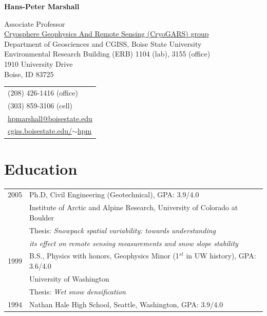 \documentclass[11pt]{article}
\def\name{Hans-Peter Marshall}
\begin{document}


\centerline{\Large \bf \name}

\vspace{0.25in}

\begin{minipage}{0.70\linewidth}
Associate Professor \\
  \href{http://earth.boisestate.edu/cryogars/}{Cryosphere Geophysics And Remote Sensing (CryoGARS) group} \\
  Department of Geosciences and CGISS, Boise State University \\
  Environmental Research Building (ERB) 1104 (lab), 3155 (office) \\
  1910 University Drive \\
  Boise, ID  83725
\end{minipage}
\begin{minipage}{0.30\linewidth}
  \begin{tabular}{l}
     (208) 426-1416 (office) \\
     (303) 859-3106 (cell) \\
    \href{mailto:hpmarshall@boisestate.edu}{hpmarshall@boisestate.edu} \\
    \href{http://cgiss.boisestate.edu/~hpm}{cgiss.boisestate.edu/$\sim$hpm} \\
  \end{tabular}
\end{minipage}

\section*{Education}

\begin{tabular}{ll}
	2005 & Ph.D, Civil Engineering (Geotechnical), GPA: 3.9/4.0 \\
	          & Institute of Arctic and Alpine Research, University of Colorado at Boulder \\
		 & Thesis: \textit{Snowpack spatial variability: towards understanding} \\
                  &   \textit{its effect on remote sensing measurements and snow slope stability} \\
	1999 &  B.S., Physics with honors, Geophysics Minor (1$^{st}$ in UW history), GPA: 3.6/4.0 \\
	         &   University of Washington \\
	         &  Thesis: \textit{Wet snow densification} \\
       1994  &  Nathan Hale High School, Seattle, Washington, GPA: 3.9/4.0 \\
\end{tabular}
\end{document}
